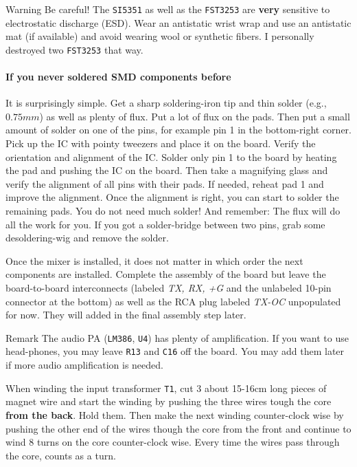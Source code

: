 \documentclass[10pt, a4paper,twoside]{scrartcl}
\newenvironment{remark}{\begin{bclogo}[couleur=blue!30,arrondi=.1,logo=\bcinfo,ombre=true]{Remark}}{\end{bclogo}}
\newenvironment{warning}{\begin{bclogo}[couleur=red!30,arrondi=.1,logo=\bcattention,ombre=true]{Warning}}{\end{bclogo}}
\begin{document}
\begin{warning}
 Be careful! The \texttt{SI5351} as well as the \texttt{FST3253} are \textbf{very} sensitive to electrostatic discharge (ESD). Wear an antistatic wrist wrap and use an antistatic mat (if available) and avoid wearing wool or synthetic fibers. I personally destroyed two \texttt{FST3253} that way. 
\end{warning}

\paragraph{If you never soldered SMD components before} It is surprisingly simple. Get a sharp soldering-iron tip and thin solder (e.g., $0.75mm$) as well as plenty of flux. Put a lot of flux on the pads. Then put a small amount of solder on one of the pins, for example pin 1 in the bottom-right corner. Pick up the IC with pointy tweezers and place it on the board. Verify the orientation and alignment of the IC. Solder only pin 1 to the board by heating the pad and pushing the IC on the board. Then take a magnifying glass and verify the alignment of all pins with their pads. If needed, reheat pad 1 and improve the alignment. Once the alignment is right, you can start to solder the remaining pads. You do not need much solder! And remember: The flux will do all the work for you. If you got a solder-bridge between two pins, grab some desoldering-wig and remove the solder. 

Once the mixer is installed, it does not matter in which order the next components are installed. Complete the assembly of the board but leave the board-to-board interconnects (labeled \emph{TX, RX, +G} and the unlabeled 10-pin connector at the bottom) as well as the RCA plug labeled \emph{TX-OC } unpopulated for now. They will added in the final assembly step later.

\begin{remark}
The audio PA (\texttt{LM386}, \texttt{U4}) has plenty of amplification. If you want to use head-phones, you may leave \texttt{R13} and \texttt{C16} off the board. You may add them later if more audio amplification is needed.
\end{remark}

When winding the input transformer \texttt{T1}, cut 3 about 15-16cm long pieces of magnet wire and start the winding by pushing the three wires tough the core \textbf{from the back}. Hold them. Then make the next winding counter-clock wise by pushing the other end of the wires though the core from the front and continue to wind 8 turns on the core counter-clock wise. Every time the wires pass through the core, counts as a turn. 
\end{document}
